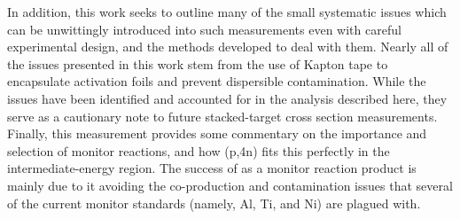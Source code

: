 % 
% 
% 


In addition, this work seeks to outline many of the small systematic issues which can be unwittingly introduced into such measurements even with careful experimental design, and the methods developed to deal with them.
Nearly all of the issues presented in this work stem from the use of Kapton tape to encapsulate activation foils and prevent dispersible contamination.
While the issues have been identified and accounted for in the analysis described here, they serve as a cautionary note to future stacked-target cross section measurements.
Finally, this measurement provides some commentary on the importance and selection of monitor reactions, and how (p,4n) fits this perfectly in the intermediate-energy region.
The success of  as a monitor reaction product is mainly due to it avoiding the co-production and contamination issues that several of the current monitor standards (namely, Al, Ti, and Ni) are plagued with.


